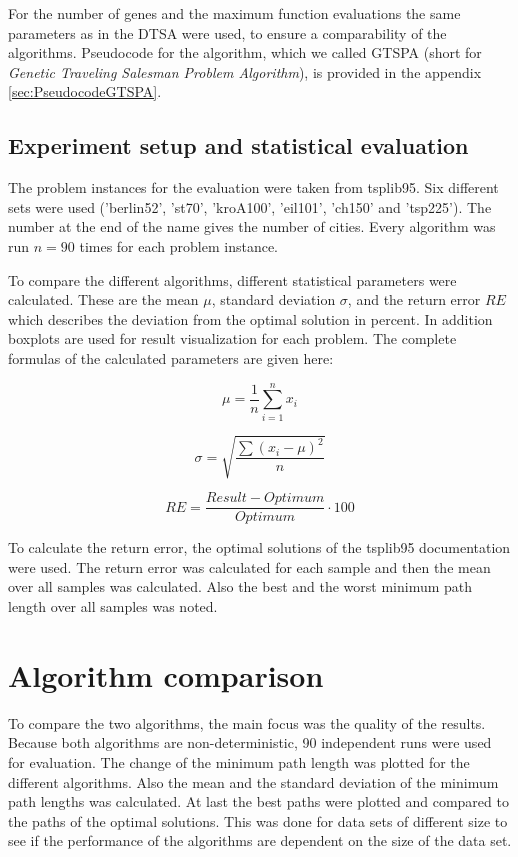 \documentclass[12pt]{article}
\theoremstyle{plain}
\theoremstyle{definition}
\theoremstyle{remark}
\begin{document}
For the number of genes and the maximum function evaluations the same parameters as in the DTSA were used, to ensure a comparability of the algorithms. Pseudocode for the algorithm, which we called GTSPA (short for \emph{Genetic Traveling Salesman Problem Algorithm}), is provided in the appendix \ref{sec:PseudocodeGTSPA}.

\subsection{Experiment setup and statistical evaluation}

The problem instances for the evaluation were taken from tsplib95\cite{tsplib95}.
Six different sets were used ('berlin52', 'st70', 'kroA100', 'eil101', 'ch150' and 'tsp225').
The number at the end of the name gives the number of cities.
Every algorithm was run $n=90$ times for each problem instance.

To compare the different algorithms, different statistical parameters were calculated.
These are the mean $\mu$, standard deviation $\sigma$, and the return error $RE$ which describes the deviation from the optimal solution in percent.
In addition boxplots\cite{Spear52} are used for result visualization for each problem.
The complete formulas of the calculated parameters are given here:

\begin{equation}
	\mu = \frac{1}{n}\sum_{i=1}^{n}x_{i}
\end{equation}

\begin{equation}
	\sigma = \sqrt{\frac{\sum(x_{i}-\mu)^2}{n}}
\end{equation}

\begin{equation}
	RE = \frac{Result - Optimum}{Optimum} \cdot 100
\end{equation}

To calculate the return error, the optimal solutions of the tsplib95 documentation \cite{tsplib95} were used.
The return error was calculated for each sample and then the mean over all samples was calculated.
Also the best and the worst minimum path length over all samples was noted.

\section{Algorithm comparison}
\label{sec:comparison}

To compare the two algorithms, the main focus was the quality of the results.
Because both algorithms are non-deterministic, 90 independent runs were used for evaluation.
The change of the minimum path length was plotted for the different algorithms.
Also the mean and the standard deviation of the minimum path lengths was calculated.
At last the best paths were plotted and compared to the paths of the optimal solutions.
This was done for data sets of different size to see if the performance of the algorithms are dependent on the size of the data set.
\end{document}
